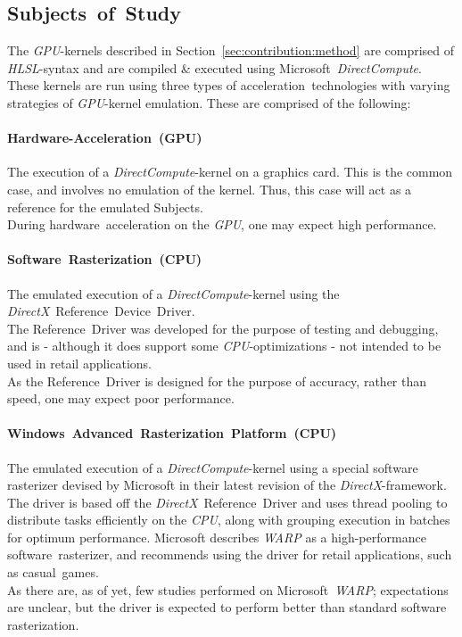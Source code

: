 \documentclass[fleqn,10pt]{SelfArx} %
\begin{document}
\subsection{Subjects~of~Study}
\label{sec:contribution:Subjectofstudy}
The \textit{GPU}-kernels described in Section~\ref{sec:contribution:method} are comprised of \textit{HLSL}-syntax and are compiled \& executed using Microsoft~\textit{DirectCompute}. These kernels are run using three types of acceleration~technologies with varying strategies of \textit{GPU}-kernel emulation. These are comprised of the following:
\paragraph{Hardware-Acceleration~(GPU)}
	The execution of a \textit{DirectCompute}-kernel on a graphics card. This is the common case, and involves no emulation of the kernel. Thus, this case will act as a reference for the emulated Subjects.\\
	During hardware~acceleration on the \textit{GPU}, one may expect high performance.
\paragraph{Software~Rasterization~(CPU)}
	The emulated execution of a \textit{DirectCompute}-kernel using the \textit{DirectX}~Reference~Device~Driver.\\
The Reference~Driver was developed for the purpose of testing and debugging, and is - although it does support some \textit{CPU}-optimizations - not intended to be used in retail applications.\\
	As the Reference~Driver is designed for the purpose of accuracy, rather than speed, one may expect poor performance.
\paragraph{Windows~Advanced~Rasterization~Platform~(CPU)}
	The emulated execution of a \textit{DirectCompute}-kernel using a special software rasterizer devised by Microsoft in their latest revision of the \textit{DirectX}-framework.\\
	The driver is based off the \textit{DirectX}~Reference~Driver and uses thread pooling to distribute tasks efficiently on the \textit{CPU}, along with grouping execution in batches for optimum performance. Microsoft describes \textit{WARP} as a high-performance software~rasterizer, and recommends using the driver for retail applications, such as casual~games.\\
As there are, as of yet, few studies performed on Microsoft~\textit{WARP}; expectations are unclear, but the driver is expected to perform better than standard software rasterization.\\
\end{document}
